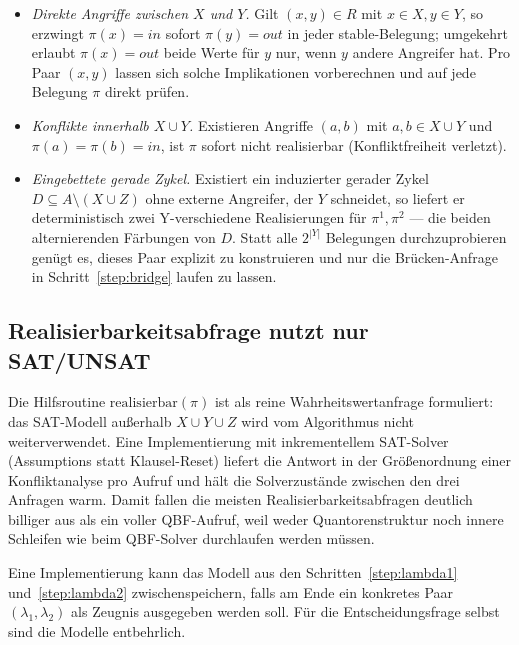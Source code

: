 \begin{itemize}
    \item \emph{Direkte Angriffe zwischen \(X\) und \(Y\).} Gilt
        \((x,y)\in R\) mit \(x\in X, y\in Y\), so erzwingt
        \(\pi(x)=\mathit{in}\) sofort \(\pi(y)=\mathit{out}\) in jeder
        stable-Belegung; umgekehrt erlaubt \(\pi(x)=\mathit{out}\)
        beide Werte für \(y\) nur, wenn \(y\) andere Angreifer hat. Pro
        Paar \((x,y)\) lassen sich solche Implikationen vorberechnen
        und auf jede Belegung \(\pi\) direkt prüfen.
    \item \emph{Konflikte innerhalb \(X\cup Y\).} Existieren Angriffe
        \((a,b)\) mit \(a, b\in X\cup Y\) und \(\pi(a)=\pi(b)=
        \mathit{in}\), ist \(\pi\) sofort nicht realisierbar
        (Konfliktfreiheit verletzt).
    \item \emph{Eingebettete gerade Zykel.} Existiert ein induzierter
        gerader Zykel \(D \subseteq A\setminus(X\cup Z)\) ohne externe
        Angreifer, der \(Y\) schneidet, so liefert er deterministisch
        zwei Y-verschiedene Realisierungen für \(\pi^1, \pi^2\) --- die
        beiden alternierenden Färbungen von \(D\). Statt alle
        \(2^{|Y|}\) Belegungen durchzuprobieren genügt es, dieses Paar
        explizit zu konstruieren und nur die Brücken-Anfrage in
        Schritt~\ref{step:bridge} laufen zu lassen.
\end{itemize}

\subsection{Realisierbarkeitsabfrage nutzt nur SAT/UNSAT}
\label{subsec:heur-no-completion}

Die Hilfsroutine \(\mathrm{realisierbar}(\pi)\) ist als reine
Wahrheitswertanfrage formuliert: das SAT-Modell außerhalb
\(X\cup Y\cup Z\) wird vom Algorithmus nicht weiterverwendet. Eine
Implementierung mit inkrementellem SAT-Solver (Assumptions statt
Klausel-Reset) liefert die Antwort in der Größenordnung einer
Konflikt\-analyse pro Aufruf und hält die Solverzustände zwischen den
drei Anfragen warm. Damit fallen die meisten Realisierbarkeitsabfragen
deutlich billiger aus als ein voller QBF-Aufruf, weil weder
Quantorenstruktur noch innere Schleifen wie beim QBF-Solver
durchlaufen werden müssen.

Eine Implementierung kann das Modell aus den Schritten~\ref{step:lambda1}
und~\ref{step:lambda2} zwischenspeichern, falls am Ende ein konkretes
Paar \((\lambda_1, \lambda_2)\) als Zeugnis ausgegeben werden soll.
Für die Entscheidungsfrage selbst sind die Modelle entbehrlich.


